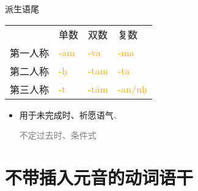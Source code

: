 \documentclass[17pt]{beamer}
\newcommand{\wordending}[1]{\textcolor{Orange}{\nobreakdash-#1}}
\newcommand{\notsoimportant}[1]{\textcolor{gray}{#1}}
\begin{document}
\begin{frame}{派生语尾}
  \centering
  \begin{tabular}{@{}llll@{}} %
    & 单数  & 双数  & 复数 \\
    第一人称 & \cellcolor{green!20}\wordending{am} & \wordending{va}  & \wordending{ma}  \\
    第二人称 & \cellcolor{yellow!30}\wordending{ḥ} & \wordending{tam} & \wordending{ta}  \\
    第三人称 & \cellcolor{yellow!30}\wordending{t} & \wordending{tām} & \cellcolor{green!20}\wordending{an/uḥ}  \\
  \end{tabular}  
  \bigskip
  \begin{itemize}
    \item 用于未完成时、祈愿语气\notsoimportant{、}
    
    \notsoimportant{不定过去时、条件式}
  \end{itemize}
\end{frame}

\section{不带插入元音的动词语干}
\begin{frame}{\insertsection }
    \tableofcontents[currentsection]
\end{frame}
\end{document}
